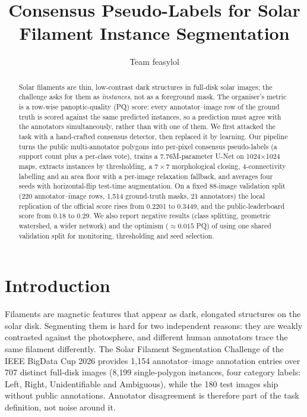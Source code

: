 \documentclass[sigconf]{acmart}
\title{Consensus Pseudo-Labels for Solar\\
Filament Instance Segmentation}
\author{Team feasylol}
\begin{document}
\begin{abstract}
Solar filaments are thin, low-contrast dark structures in full-disk solar
images; the challenge asks for them as \emph{instances}, not as a foreground
mask. The organiser's metric is a row-wise panoptic-quality (PQ) score: every
annotator--image row of the ground truth is scored against the same predicted
instances, so a prediction must agree with the annotators simultaneously,
rather than with one of them. We first attacked the task with a
hand-crafted consensus detector, then replaced it by learning. Our pipeline
turns the public multi-annotator polygons into per-pixel consensus
pseudo-labels (a support count plus a per-class vote), trains a
7.76M-parameter U-Net on 1024$\times$1024 maps, extracts instances by
thresholding, a $7\times7$ morphological closing, 4-connectivity labelling and
an area floor with a per-image relaxation fallback, and averages four seeds
with horizontal-flip test-time augmentation. On a
fixed 88-image validation split (220 annotator--image rows, 1{,}514
ground-truth masks, 21 annotators) the local replication of the official score
rises from 0.2201 to 0.3449, and the public-leaderboard score from 0.18 to
0.29. We also report negative results (class splitting, geometric watershed, a
wider network) and the optimism ($\approx 0.015$ PQ) of using one shared
validation split for monitoring, thresholding and seed selection.
\end{abstract}

\maketitle

\section{Introduction}
Filaments are magnetic features that appear as dark, elongated structures on
the solar disk. Segmenting them is hard for two independent reasons: they are
weakly contrasted against the photosphere, and different human annotators
trace the same filament differently. The Solar Filament Segmentation Challenge
of the IEEE BigData Cup 2026 provides 1{,}154 annotator--image annotation
entries over 707 distinct full-disk images (8{,}199 single-polygon instances,
four category labels: Left, Right, Unidentifiable and Ambiguous), while the 180
test images ship without public annotations. Annotator disagreement is
therefore part of the task definition, not noise around it.
\end{document}
